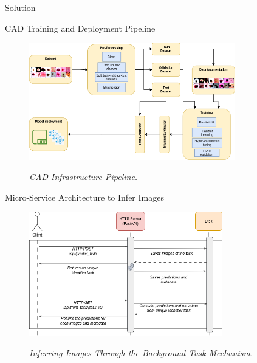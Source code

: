 \documentclass[dvipsnames,mathserif]{beamer}
\begin{document}
{\begin{frame}
    \end{frame}


    \begin{frame}
      \begin{center}
        \Huge Solution
      \end{center}
    \end{frame}


    \begin{frame}

      \large CAD Training and Deployment Pipeline
      \vspace{0.25cm}

      \begin{figure}[H]
        \centering
        \includegraphics[width=0.8\textwidth]{images/Pipeline.drawio.png}
        \caption[CAD Infrastructure Pipeline]{\textit{CAD Infrastructure Pipeline.}}
        {\label{fig:cad-infrastructure-training-system}}
      \end{figure}

    \end{frame}

    \begin{frame}
      \large Micro-Service Architecture to Infer Images
      \vspace{0.25cm}

      \begin{figure}[H]
        \centering
        \includegraphics[width=0.75\textwidth]{images/BackgroundTask.drawio.png}
        \caption[Inferring Images Through the Background Task Mechanism]{\textit{Inferring Images Through the Background Task Mechanism.  }}
        {\label{fig:backgrond-task}}
      \end{figure}


\end{frame}}
\end{document}
